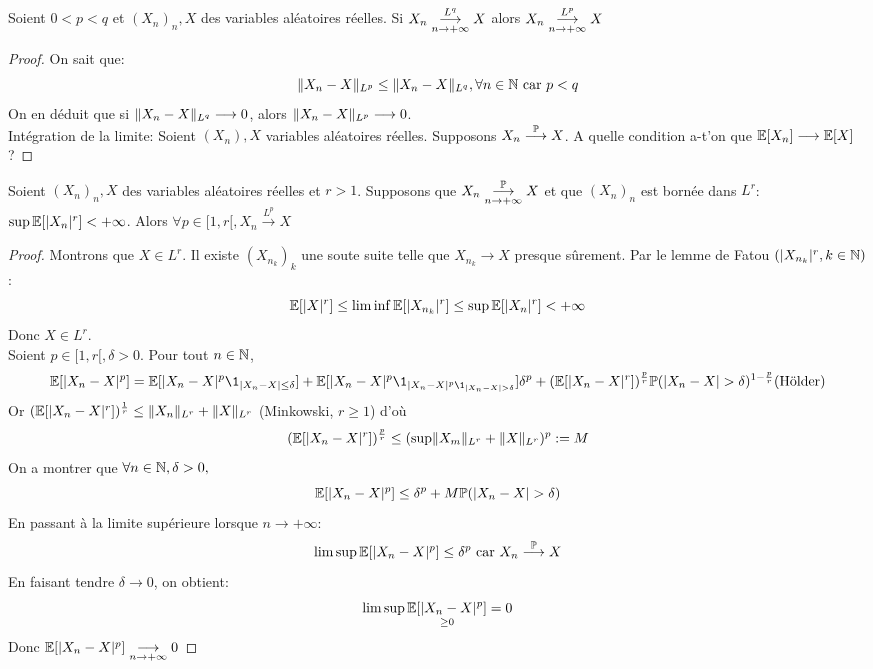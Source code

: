 \documentclass[]{report}
\begin{document}
    \begin{lm}{}{}
        Soient $0<p<q$ et $(X_n)_n,X$ des variables aléatoires réelles. Si $X_n\overunderset{L^q}{n\to +\infty}{\longrightarrow} X$ alors $X_n \overunderset{L^p}{n\to +\infty}{\longrightarrow}X$
    \end{lm}

    \begin{proof}
        On sait que:
        \[\lVert X_n-X \rVert_{L^p}\le \lVert  X_n-X \rVert_{L^q},\forall n\in \mathbb{N}\text{ car }p<q\]
        On en déduit que si $\lVert X_n-X \rVert_{L^q}\longrightarrow 0$, alors $\lVert X_n-X \rVert_{L^p}\longrightarrow 0$.\\
        Intégration de la limite: Soient $(X_n),X$ variables aléatoires réelles. Supposons $X_n\overset{\mathbb{P}}{\longrightarrow}X$. A quelle condition a-t'on que $\mathbb{E}[X_n]\longrightarrow \mathbb{E}[X]$ ?
    \end{proof}

    \begin{lm}{}{}
        Soient $(X_n)_n,X$ des variables aléatoires réelles et $r>1$. Supposons que $X_n\overunderset{\Pa}{n\to +\infty}{\longrightarrow} X$ et que $(X_n)_n$ est bornée dans $L^r$: $\sup \mathbb{E}[|X_n|^r]<+\infty$. Alors $\forall p\in [1,r[, X_n\overset{L^p}{\longrightarrow}X$
    \end{lm}

    \begin{proof}
        Montrons que $X\in L^r$.
        Il existe $(X_{n_k})_k$ une soute suite telle que $X_{n_k}\to X$ presque sûrement. Par le lemme de Fatou $(|X_{n_k}|^r,k\in \mathbb{N})$:
        \[\mathbb{E}[|X|^r]\le \liminf \mathbb{E}[|X_{n_k}|^r]\le \sup \mathbb{E}[|X_n|^r]<+\infty\]
        Donc $X\in L^r$.\\
        Soient $p\in [1,r[,\delta>0$. Pour tout $n\in \mathbb{N}$,
        \[\Ea[|X_n-X|^p]=\Ea[|X_n-X|^p \1_{|X_n-X|\le \delta}]+\Ea[|X_n-X|^p\1_{|X_n-X|^p\1_{|X_n-X|>\delta}}]\delta^p+(\Ea[|X_n-X|^r])^{\frac{p}{r}}\Pa(|X_n-X|>\delta)^{1-\frac{p}{r}}\text{(Hölder)}\]
        Or $(\mathbb{E}[|X_n-X|^r])^{\frac{1}{r}}\le \lVert X_n \rVert_{L^r}+\lVert X \rVert_{L^r}$ (Minkowski, $r\ge 1$) d'où
        \[(\mathbb{E}[|X_n-X|^r])^{\frac{p}{r}}\le (\sup \lVert X_m \rVert_{L^r}+\lVert X \rVert_{L^r})^{p}:=M\]
        On a montrer que $\forall n\in \mathbb{N}, \delta>0,$
        \[\Ea[|X_n-X|^p]\le \delta^p+M\Pa(|X_n-X|>\delta)\]
        En passant à la limite supérieure lorsque $n\to +\infty$:
        \[\limsup \mathbb{E}[|X_n-X|^p]\le \delta^p\text{ car }X_n\overset{\mathbb{P}}{\longrightarrow}X\]
        En faisant tendre $\delta\to 0$, on obtient:
        \[\limsup \underset{\ge 0}{\mathbb{E}[|X_n-X|^p]}=0\]
        Donc $\mathbb{E}[|X_n-X|^p]\underset{n\to +\infty}{\longrightarrow}0$
    \end{proof}
\end{document}
